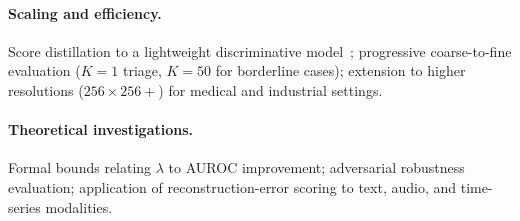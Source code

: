 \paragraph{Scaling and efficiency.}
Score distillation to a lightweight discriminative
model~\cite{wu2024diffusion}; progressive coarse-to-fine evaluation
($K{=}1$ triage, $K{=}50$ for borderline cases); extension to higher
resolutions ($256{\times}256{+}$) for medical and industrial settings.

\paragraph{Theoretical investigations.}
Formal bounds relating $\lambda$ to AUROC improvement; adversarial
robustness evaluation; application of reconstruction-error scoring to
text, audio, and time-series modalities.
\endgroup
